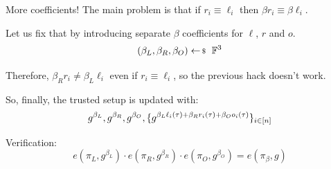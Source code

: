 \documentclass{zkdl-presentation-template}
\begin{document}
    \begin{frame}{More coefficients!}
        The main problem is that if $r_i \equiv \ell_i$ then $\beta r_i \equiv \beta \ell_i$.\pause

        Let us fix that by introducing separate $\beta$ coefficients for $\ell$, $r$ and $o$.
        \begin{equation*}
            \left( \beta_L, \beta_R, \beta_O \right) \leftarrowS \mathbb{F}^3
            \vspace{-5pt}
        \end{equation*}
        \pause

        Therefore, $\beta_R r_i \neq \beta_L \ell_i$ even if $r_i \equiv \ell_i$, so the previous hack doesn't work.\pause

        So, finally, the trusted setup is updated with:
        \vspace{-5pt}
        \begin{equation*}
            g^{\beta_L}, g^{\beta_R}, g^{\beta_O}, \{g^{\beta_L\ell_i(\tau) + \beta_Rr_i(\tau) + \beta_Oo_i(\tau)}\}_{i \in [n]}
            \vspace{-5pt}
        \end{equation*}
        \pause

        Verification:
        \vspace{-5pt}
        \begin{equation*}
            e(\pi_L, g^{\beta_L}) \cdot e(\pi_R, g^{\beta_R}) \cdot e(\pi_O, g^{\beta_O}) = e(\pi_{\beta}, g)
        \end{equation*}
    \end{frame}
\end{document}
